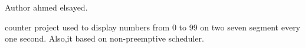 \begin{DoxyAuthor}{Author}
ahmed elsayed.
\end{DoxyAuthor}
counter project used to display numbers from 0 to 99 on two seven segment every one second. Also,it based on non-\/preemptive scheduler. 